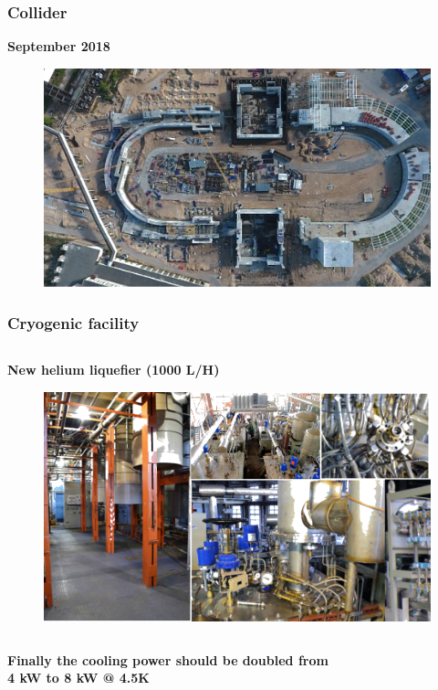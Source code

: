 \documentclass[dvipsnames] {beamer}
\begin{document}
\begin{frame}
  \frametitle{\bf \centering Collider}
  \begin{block}{\bf \centering September 2018}
     \begin{figure}[H]
        \includegraphics[width=1.\linewidth]{collider_now.png} 
      \end{figure}
  \end{block}
\end{frame}

\begin{frame}
  \frametitle{\bf \centering Cryogenic facility}
  \vskip -0.75cm
  \begin{columns}[t]
    \begin{block}{\bf \centering New helium liquefier (1000 L/H)}
      \begin{figure}[H]
        \includegraphics[width=1.\linewidth]{liquefier.png} 
      \end{figure}
    \end{block}
    
  \end{columns}
  \begin{block}{}
    \bf Finally the cooling power should be doubled from \\ 4 kW to 8 kW @ 4.5K
  \end{block}
\end{frame}
\end{document}
